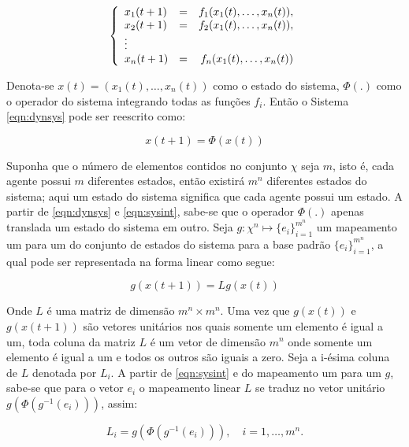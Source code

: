\documentclass[12pt,a4paper]{article}
\begin{document}
\begin{equation}
\left\{
\begin{array}{l c r}
x_1(t+1) & = & f_1(x_1(t),\ldots,x_n(t)), \\
x_2(t+1) & = & f_2(x_1(t),\ldots,x_n(t)), \\
\vdots & & \\
x_n(t+1) & = & f_n(x_1(t),\ldots,x_n(t)) \\
\end{array} \right.
\label{eqn:dynsys}
\end{equation}

Denota-se $x(t)=(x_1(t),\ldots,x_n(t))$ como o estado do sistema, $\Phi(.)$
como o operador do sistema integrando todas as funções $f_i$. Então o
Sistema \ref{eqn:dynsys} pode ser reescrito como:

\begin{equation}
\label{eqn:sysint}
x(t+1) = \Phi(x(t))
\end{equation}

Suponha que o número de elementos contidos no conjunto $\chi$ seja $m$, isto é,
cada agente possui $m$ diferentes estados, então existirá $m^n$ diferentes
estados do sistema; aqui um estado do sistema significa que cada agente possui
um estado. A partir de \ref{eqn:dynsys} e \ref{eqn:sysint}, sabe-se que o
operador $\Phi(.)$ apenas translada um estado do sistema em outro. Seja
$g: \chi^n \mapsto \{e_i\}^{m^n}_{i=1}$ um mapeamento um para um do conjunto
de estados do sistema para a base padrão $\{e_i\}^{m^n}_{i=1}$, a qual
pode ser representada na forma linear como segue:

\begin{equation}
\label{eqn:linsys}
g(x(t+1)) = Lg(x(t))
\end{equation}

Onde $L$ é uma matriz de dimensão $m^n \times m^n$. Uma vez que $g(x(t))$
e $g(x(t+1))$ são vetores unitários nos quais somente um elemento é igual
a um, toda coluna da matriz $L$ é um vetor de dimensão $m^n$ onde somente um
elemento é igual a um e todos os outros são iguais a zero. Seja a i-ésima
coluna de $L$ denotada por $L_i$. A partir de \ref{eqn:sysint} e do mapeamento
um para um $g$, sabe-se que para o vetor $e_i$ o mapeamento linear $L$ se traduz
no vetor unitário $g(\Phi(g^{-1}(e_i)))$, assim:

\begin{equation}
L_i = g(\Phi(g^{-1}(e_i))), \quad i=1,\ldots,m^n.
\end{equation}
\end{document}
